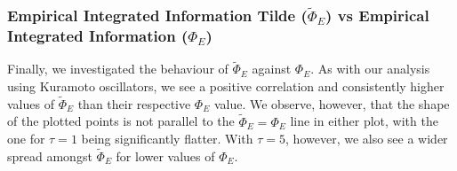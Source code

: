 \documentclass[a4paper,11pt]{article}
\begin{document}
\subsubsection{Empirical Integrated Information Tilde ($\widetilde{\Phi}_E$) vs Empirical Integrated Information ($\Phi_E$)}

Finally, we investigated the behaviour of $\widetilde{\Phi}_{E}$ against $\Phi_{E}$. As with our analysis using Kuramoto oscillators, we see a positive correlation and consistently higher values of $\widetilde{\Phi}_{E}$ than their respective $\Phi_E$ value.  We observe, however, that the shape of the plotted points is not parallel to the $\widetilde{\Phi}_{E} = \Phi_E$ line in either plot, with the one for $\tau = 1$ being significantly flatter. With $\tau = 5$, however, we also see a wider spread amongst $\widetilde{\Phi}_{E}$ for lower values of $\Phi_E$.
\end{document}
